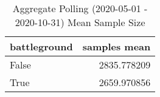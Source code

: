\begin{table}
\centering
\caption{Aggregate Polling (2020-05-01 - 2020-10-31) Mean Sample Size}
\label{table:aggregate\_polling\_2020-05-01\_-\_2020-10-31\_mean\_sample\_size}
\begin{tabular}{lr}
\toprule
 battleground &  samples mean \\
\midrule
        False &   2835.778209 \\
         True &   2659.970856 \\
\bottomrule
\end{tabular}
\end{table}
